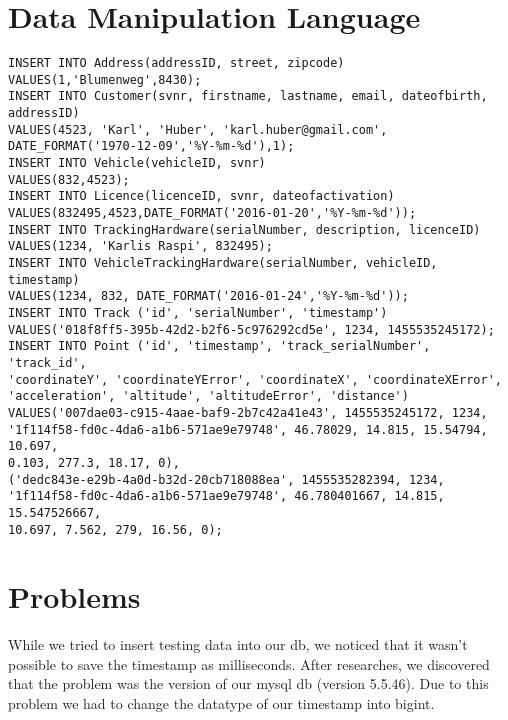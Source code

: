 \section{Data Manipulation Language}
\begin{verbatim}
INSERT INTO Address(addressID, street, zipcode)
VALUES(1,'Blumenweg',8430);
INSERT INTO Customer(svnr, firstname, lastname, email, dateofbirth, addressID)
VALUES(4523, 'Karl', 'Huber', 'karl.huber@gmail.com',
DATE_FORMAT('1970-12-09','%Y-%m-%d'),1);
INSERT INTO Vehicle(vehicleID, svnr)
VALUES(832,4523);
INSERT INTO Licence(licenceID, svnr, dateofactivation)
VALUES(832495,4523,DATE_FORMAT('2016-01-20','%Y-%m-%d'));
INSERT INTO TrackingHardware(serialNumber, description, licenceID)
VALUES(1234, 'Karlis Raspi', 832495);
INSERT INTO VehicleTrackingHardware(serialNumber, vehicleID, timestamp)
VALUES(1234, 832, DATE_FORMAT('2016-01-24','%Y-%m-%d'));
INSERT INTO Track ('id', 'serialNumber', 'timestamp') 
VALUES('018f8ff5-395b-42d2-b2f6-5c976292cd5e', 1234, 1455535245172);
INSERT INTO Point ('id', 'timestamp', 'track_serialNumber', 'track_id', 
'coordinateY', 'coordinateYError', 'coordinateX', 'coordinateXError', 
'acceleration', 'altitude', 'altitudeError', 'distance') 
VALUES('007dae03-c915-4aae-baf9-2b7c42a41e43', 1455535245172, 1234, 
'1f114f58-fd0c-4da6-a1b6-571ae9e79748', 46.78029, 14.815, 15.54794, 10.697, 
0.103, 277.3, 18.17, 0),
('dedc843e-e29b-4a0d-b32d-20cb718088ea', 1455535282394, 1234, 
'1f114f58-fd0c-4da6-a1b6-571ae9e79748', 46.780401667, 14.815, 15.547526667, 
10.697, 7.562, 279, 16.56, 0);
\end{verbatim}
\section{Problems}
While we tried to insert testing data into our \gls{db}, we noticed that it wasn’t possible to save the timestamp as milliseconds. After researches, we discovered that the problem was the version of our \gls{mysql} \gls{db} (version 5.5.46). Due to this problem we had to change the datatype of our timestamp into bigint.
